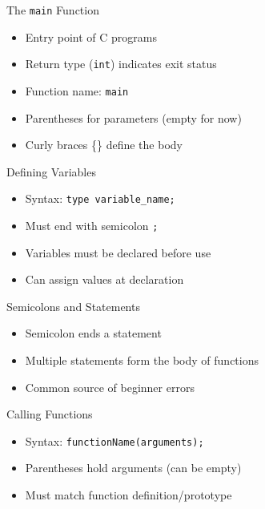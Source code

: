 \documentclass[12pt, aspectratio=169]{beamer}
\begin{document}
    \begin{frame}{The \texttt{main} Function}
        \begin{itemize}
            \item Entry point of C programs
            \item Return type (\texttt{int}) indicates exit status
            \item Function name: \texttt{main}
            \item Parentheses for parameters (empty for now)
            \item Curly braces \{\} define the body
        \end{itemize}
    \end{frame}


    \begin{frame}{Defining Variables}
        \begin{itemize}
            \item Syntax: \texttt{type variable\_name;}
            \item Must end with semicolon \texttt{;}
            \item Variables must be declared before use
            \item Can assign values at declaration
        \end{itemize}
    \end{frame}


    \begin{frame}{Semicolons and Statements}
        \begin{itemize}
            \item Semicolon ends a statement
            \item Multiple statements form the body of functions
            \item Common source of beginner errors
        \end{itemize}
    \end{frame}


    \begin{frame}{Calling Functions}
        \begin{itemize}
            \item Syntax: \texttt{functionName(arguments);}
            \item Parentheses hold arguments (can be empty)
            \item Must match function definition/prototype
        \end{itemize}
    \end{frame}
\end{document}
